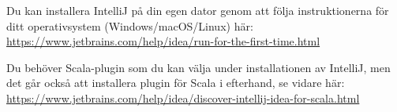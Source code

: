 Du kan installera IntelliJ på din egen dator genom att följa instruktionerna för ditt operativsystem (Windows/macOS/Linux) här: \\
\url{https://www.jetbrains.com/help/idea/run-for-the-first-time.html}


Du behöver Scala-plugin som du kan välja under installationen av IntelliJ, men det går också att installera plugin för Scala i efterhand, se vidare här:\\
\url{https://www.jetbrains.com/help/idea/discover-intellij-idea-for-scala.html} 







  
